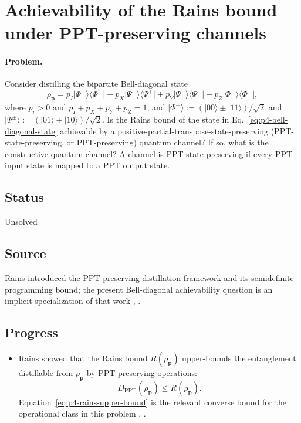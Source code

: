 \section{Achievability of the Rains bound under PPT-preserving channels}
\label{sec:problem-4}

\paragraph{Problem.}
Consider distilling the bipartite Bell-diagonal state
\begin{equation}
  \rho_{\mathbf p}
  =p_I\lvert\Phi^+\rangle\!\langle\Phi^+\rvert
  +p_X\lvert\Psi^+\rangle\!\langle\Psi^+\rvert
  +p_Y\lvert\Psi^-\rangle\!\langle\Psi^-\rvert
  +p_Z\lvert\Phi^-\rangle\!\langle\Phi^-\rvert,
  \label{eq:p4-bell-diagonal-state}
\end{equation}
where $p_i>0$ and $p_I+p_X+p_Y+p_Z=1$, and
$\lvert\Phi^\pm\rangle:=(\lvert00\rangle\pm\lvert11\rangle)/\sqrt2$ and
$\lvert\Psi^\pm\rangle:=(\lvert01\rangle\pm\lvert10\rangle)/\sqrt2$.
Is the Rains bound of the state in Eq.~\eqref{eq:p4-bell-diagonal-state}
achievable by a positive-partial-transpose-state-preserving
(PPT-state-preserving, or PPT-preserving) quantum channel?  If so, what is the
constructive quantum channel?  A channel is PPT-state-preserving if every PPT
input state is mapped to a PPT output state.

\subsection*{Status}

Unsolved

\subsection*{Source}

Rains introduced the PPT-preserving distillation framework and its
semidefinite-programming bound; the present Bell-diagonal achievability
question is an implicit specialization of that work
,
.

\subsection*{Progress}

\begin{itemize}
  \item Rains showed that the Rains bound $R(\rho_{\mathbf p})$ upper-bounds
  the entanglement distillable from $\rho_{\mathbf p}$ by PPT-preserving
  operations:
  \begin{equation}
    D_{\mathrm{PPT}}(\rho_{\mathbf p})\le R(\rho_{\mathbf p}).
    \label{eq:p4-rains-upper-bound}
  \end{equation}
  Equation~\eqref{eq:p4-rains-upper-bound} is the relevant converse bound for
  the operational class in this problem
  ,
  .
\end{itemize}

